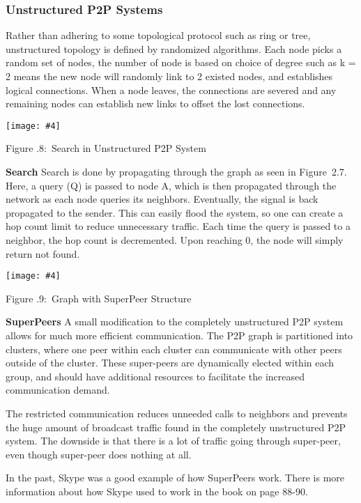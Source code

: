 \documentclass[twoside]{article}
\newcounter{lecnum}
\newcommand{\fig}[4]{
            \centerline{\texttt{[image: \#4]}}
            \begin{center}
            Figure \thelecnum.#1:~#3
            \end{center}
    }
\begin{document}
\subsubsection{Unstructured P2P Systems}

Rather than adhering to some topological protocol such as ring or tree, unstructured topology is defined by randomized algorithms. Each node picks a random set of nodes, the number of node is based on choice of degree such as k = 2 means the new node will randomly link to 2 existed nodes, and establishes logical connections. When a node leaves, the connections are severed and any remaining nodes can establish new links to offset the lost connections.

\fig{8}{0.4}{Search in Unstructured P2P System}{search.png}
\textbf{Search} Search is done by propagating through the graph as seen in Figure~2.7. Here, a query (Q) is passed to node A, which is then propagated through the network as each node queries its neighbors. Eventually, the signal is back propagated to the sender. This can easily flood the system, so one can create a hop count limit to reduce unnecessary traffic. Each time the query is passed to a neighbor, the hop count is decremented. Upon reaching 0, the node will simply return not found. 

\fig{9}{0.5}{Graph with SuperPeer Structure}{superpeer.png}
\textbf{SuperPeers} A small modification to the completely unstructured P2P system allows for much more efficient communication. The P2P graph is partitioned into clusters, where one peer within each cluster can communicate with other peers outside of the cluster. These super-peers are dynamically elected within each group, and should have additional resources to facilitate the increased communication demand. 

The restricted communication reduces unneeded calls to neighbors and prevents the huge amount of broadcast traffic found in the completely unstructured P2P system.
The downside is that there is a lot of traffic going through super-peer, even though super-peer does nothing at all.

In the past, Skype was a good example of how SuperPeers work.  There is more information about how Skype used to work in the book on page 88-90.
\end{document}
